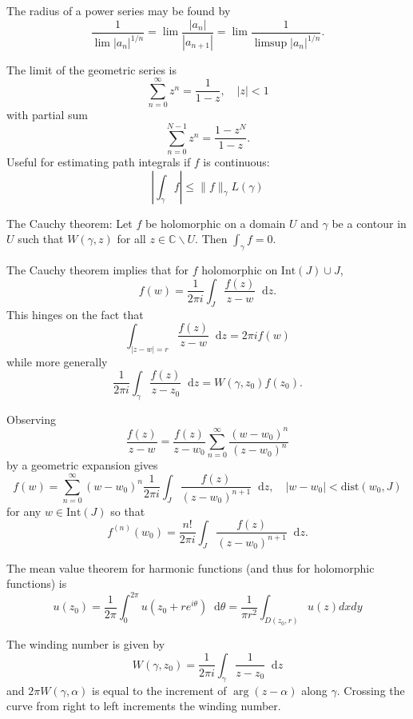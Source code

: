 \documentclass[10pt]{article}
\newcommand\dif{\mathop{}\!\mathrm{d}}
\begin{document}
The radius of a power series may be found by
$$
  \frac{1}{\lim |a_n|^{1/n}}
= \lim \frac{|a_n|}{|a_{n+1}|}
= \lim \frac{1}{\limsup |a_n|^{1 / n}}.
$$

The limit of the geometric series is
$$
\sum_{n=0}^\infty z^n = \frac{1}{1 - z}, \quad |z| < 1
$$
with partial sum
$$
\sum_{n=0}^{N-1} z^n = \frac{1 - z^N}{1 - z}.
$$
Useful for estimating path integrals if $f$ is continuous:
$$
\left|
  \int_\gamma f
\right|
\leq
\| f \|_\gamma L(\gamma)
$$

The Cauchy theorem: Let $f$ be holomorphic on a domain $U$
and $\gamma$ be a contour in $U$ such that $W(\gamma, z)$
for all $z \in \mathbb{C} \backslash U$. Then
$\int_\gamma f = 0$.

The Cauchy theorem implies that
for $f$ holomorphic on $\mathrm{Int}(J) \cup J$,
$$
  f(w)
= \frac{1}{2 \pi i}
  \int_J
    \frac{f(z)}{z - w}
    \dif z.
$$
This hinges on the fact that
$$
\int_{|z - w| = r}
  \frac{f(z)}
       {z - w}
  \dif z
= 2 \pi i f(w)
$$
while more generally
$$
\frac{1}{2 \pi i}
\int_\gamma
  \frac{f(z)}{z - z_0}
  \dif z
= W(\gamma, z_0) f(z_0).
$$

Observing
$$
  \frac{f(z)}{z - w}
= \frac{f(z)}{z - w_0}
  \sum_{n=0}^\infty
    \frac{(w - w_0)^n}
         {(z - w_0)^n}
$$
by a geometric expansion gives
$$
  f(w)
= \sum_{n=0}^\infty
    (w - w_0)^n
    \frac{1}{2 \pi i}
    \int_J
      \frac{f(z)}{(z - w_0)^{n+1}}
      \dif z, \quad
  |w - w_0| < \mathrm{dist}(w_0, J)
$$
for any $w \in \mathrm{Int}(J)$
so that
$$
  f^{(n)}(w_0)
= \frac{n!}{2 \pi i}
  \int_J
    \frac{f(z)}{(z - w_0)^{n+1}}
    \dif z.
$$

The mean value theorem for harmonic functions
(and thus for holomorphic functions) is
$$
  u(z_0)
= \frac{1}{2 \pi}
  \int_0^{2 \pi}
    u(z_0 + re^{i\theta})
    \dif \theta
= \frac{1}{\pi r^2}
  \int_{D(z_0, r)}
    u(z)
    dx dy
$$

The winding number is given by
$$
  W(\gamma, z_0)
= \frac{1}{2 \pi i}
  \int_\gamma
    \frac{1}{z - z_0}
    \dif z
$$
and $2\pi W(\gamma, \alpha)$ is equal to the increment
of $\arg (z - \alpha)$ along $\gamma$. Crossing the curve
from right to left increments the winding number.
\end{document}
